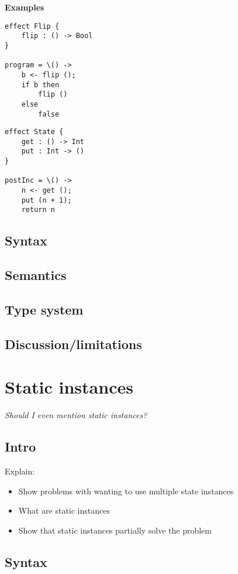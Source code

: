 {\textbf{Examples}
\begin{verbatim}
effect Flip {
	flip : () -> Bool
}

program = \() ->
	b <- flip ();
	if b then
		flip ()
	else
		false
\end{verbatim}

\begin{verbatim}
effect State {
	get : () -> Int
	put : Int -> ()
}

postInc = \() ->
	n <- get ();
	put (n + 1);
	return n
\end{verbatim}

\subsection{Syntax}

\subsection{Semantics}

\subsection{Type system}

\subsection{Discussion/limitations}

\newpage
\section{Static instances}

\textit{Should I even mention static instances?}

\subsection{Intro}
Explain:
\begin{itemize}
	\item Show problems with wanting to use multiple state instances
	\item What are static instances
	\item Show that static instances partially solve the problem
\end{itemize}

\subsection{Syntax}

}
